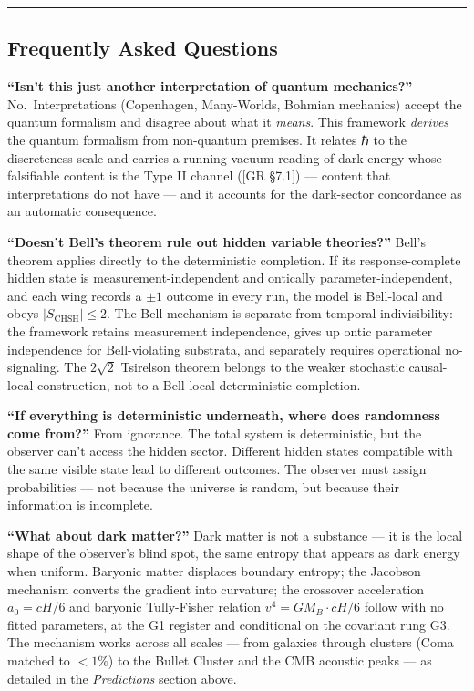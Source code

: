 \documentclass[
]{article}
\begin{document}
\begin{center}\rule{0.5\linewidth}{0.5pt}\end{center}

\hypertarget{frequently-asked-questions}{%
\subsection{Frequently Asked
Questions}\label{frequently-asked-questions}}

\textbf{``Isn't this just another interpretation of quantum
mechanics?''} No.~Interpretations (Copenhagen, Many-Worlds, Bohmian
mechanics) accept the quantum formalism and disagree about what it
\emph{means}. This framework \emph{derives} the quantum formalism from
non-quantum premises. It relates ℏ to the discreteness scale and carries
a running-vacuum reading of dark energy whose falsifiable content is the
Type II channel ({[}GR §7.1{]}) --- content that interpretations do not
have --- and it accounts for the dark-sector concordance as an automatic
consequence.

\textbf{``Doesn't Bell's theorem rule out hidden variable theories?''}
Bell's theorem applies directly to the deterministic completion. If its
response-complete hidden state is measurement-independent and ontically
parameter-independent, and each wing records a \(\pm1\) outcome in every
run, the model is Bell-local and obeys \(|S_{\mathrm{CHSH}}|\le2\). The
Bell mechanism is separate from temporal indivisibility: the framework
retains measurement independence, gives up ontic parameter independence
for Bell-violating substrata, and separately requires operational
no-signaling. The \(2\sqrt2\) Tsirelson theorem belongs to the weaker
stochastic causal-local construction, not to a Bell-local deterministic
completion.

\textbf{``If everything is deterministic underneath, where does
randomness come from?''} From ignorance. The total system is
deterministic, but the observer can't access the hidden sector.
Different hidden states compatible with the same visible state lead to
different outcomes. The observer must assign probabilities --- not
because the universe is random, but because their information is
incomplete.

\textbf{``What about dark matter?''} Dark matter is not a substance ---
it is the local shape of the observer's blind spot, the same entropy
that appears as dark energy when uniform. Baryonic matter displaces
boundary entropy; the Jacobson mechanism converts the gradient into
curvature; the crossover acceleration \(a_0 = cH/6\) and baryonic
Tully-Fisher relation \(v^4 = GM_B \cdot cH/6\) follow with no fitted
parameters, at the G1 register and conditional on the covariant rung G3.
The mechanism works across all scales --- from galaxies through clusters
(Coma matched to \(< 1\%\)) to the Bullet Cluster and the CMB acoustic
peaks --- as detailed in the \emph{Predictions} section above.
\end{document}
